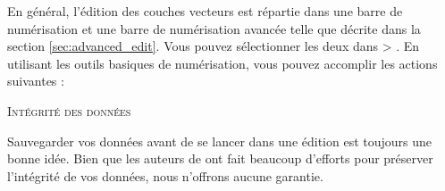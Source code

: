 
En général, l'édition des couches vecteurs est répartie dans une barre de numérisation et une barre de numérisation avancée telle que décrite dans la section \ref{sec:advanced_edit}. Vous pouvez sélectionner les deux dans  > . En utilisant les outils basiques de numérisation, vous pouvez accomplir les actions suivantes :

\begin{Tip}[ht]\caption{\textsc{Intégrité des données}}
Sauvegarder vos données avant de se lancer dans une édition est toujours une bonne idée. Bien que les auteurs de \qg ont fait beaucoup d'efforts pour préserver l'intégrité de vos données, nous n'offrons aucune garantie.
\end{Tip}
